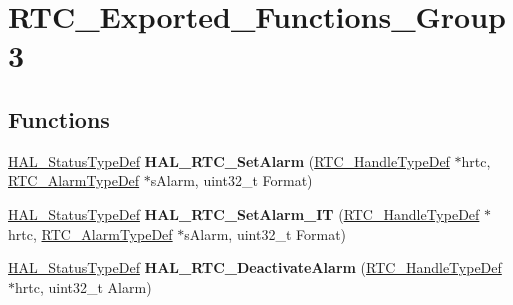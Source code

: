 \hypertarget{group___r_t_c___exported___functions___group3}{}\section{R\+T\+C\+\_\+\+Exported\+\_\+\+Functions\+\_\+\+Group3}
\label{group___r_t_c___exported___functions___group3}
\subsection*{Functions}
\begin{DoxyCompactItemize}
\item 
\mbox{\label{group___r_t_c___exported___functions___group3_gafd78015b93b16dcb9e41a4655a7ea972}} 
\hyperlink{stm32f4xx__hal__def_8h_a63c0679d1cb8b8c684fbb0632743478f}{H\+A\+L\+\_\+\+Status\+Type\+Def} {\bfseries H\+A\+L\+\_\+\+R\+T\+C\+\_\+\+Set\+Alarm} (\hyperlink{struct_r_t_c___handle_type_def}{R\+T\+C\+\_\+\+Handle\+Type\+Def} $\ast$hrtc, \hyperlink{struct_r_t_c___alarm_type_def}{R\+T\+C\+\_\+\+Alarm\+Type\+Def} $\ast$s\+Alarm, uint32\+\_\+t Format)
\item 
\mbox{\label{group___r_t_c___exported___functions___group3_gab66a7fec05e9d9374de95d5f61e16c16}} 
\hyperlink{stm32f4xx__hal__def_8h_a63c0679d1cb8b8c684fbb0632743478f}{H\+A\+L\+\_\+\+Status\+Type\+Def} {\bfseries H\+A\+L\+\_\+\+R\+T\+C\+\_\+\+Set\+Alarm\+\_\+\+IT} (\hyperlink{struct_r_t_c___handle_type_def}{R\+T\+C\+\_\+\+Handle\+Type\+Def} $\ast$hrtc, \hyperlink{struct_r_t_c___alarm_type_def}{R\+T\+C\+\_\+\+Alarm\+Type\+Def} $\ast$s\+Alarm, uint32\+\_\+t Format)
\item 
\mbox{\label{group___r_t_c___exported___functions___group3_ga186d852f8aee8a4d0dfeec778be35482}} 
\hyperlink{stm32f4xx__hal__def_8h_a63c0679d1cb8b8c684fbb0632743478f}{H\+A\+L\+\_\+\+Status\+Type\+Def} {\bfseries H\+A\+L\+\_\+\+R\+T\+C\+\_\+\+Deactivate\+Alarm} (\hyperlink{struct_r_t_c___handle_type_def}{R\+T\+C\+\_\+\+Handle\+Type\+Def} $\ast$hrtc, uint32\+\_\+t Alarm)
\item 
\mbox{\label{group___r_t_c___exported___functions___group3_ga4786b652ffee2d59da2c65dd78646405}} 

\end{DoxyCompactItemize}

